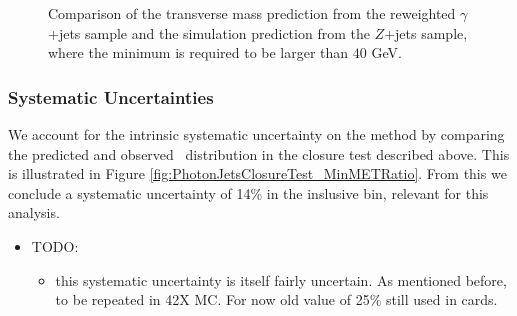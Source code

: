 \begin{figure}[!htbp]
\begin{center}
\caption{Comparison of the transverse mass prediction from the reweighted $\gamma$+jets sample 
and the simulation prediction from the $Z$+jets sample, where the minimum \met is required to be larger than 
$40$ GeV.}
\label{fig:PhotonJetsClosureTest_MtHZZ_MetPresel}
\end{center}
\end{figure}

%
%
\subsubsection{Systematic Uncertainties}

We account for the intrinsic systematic uncertainty on the method by comparing
the predicted and observed \met~distribution in the closure test described above.
This is illustrated in Figure \ref{fig:PhotonJetsClosureTest_MinMETRatio}.
From this we conclude a systematic uncertainty of 14\% in the inslusive bin, relevant for this analysis.

\begin{itemize}
    \item TODO:
    \begin{itemize}
        \item this systematic uncertainty is itself fairly uncertain.
As mentioned before, to be repeated in 42X MC.  For now old value of 25\% still used in cards.
    \end{itemize}
\end{itemize}



